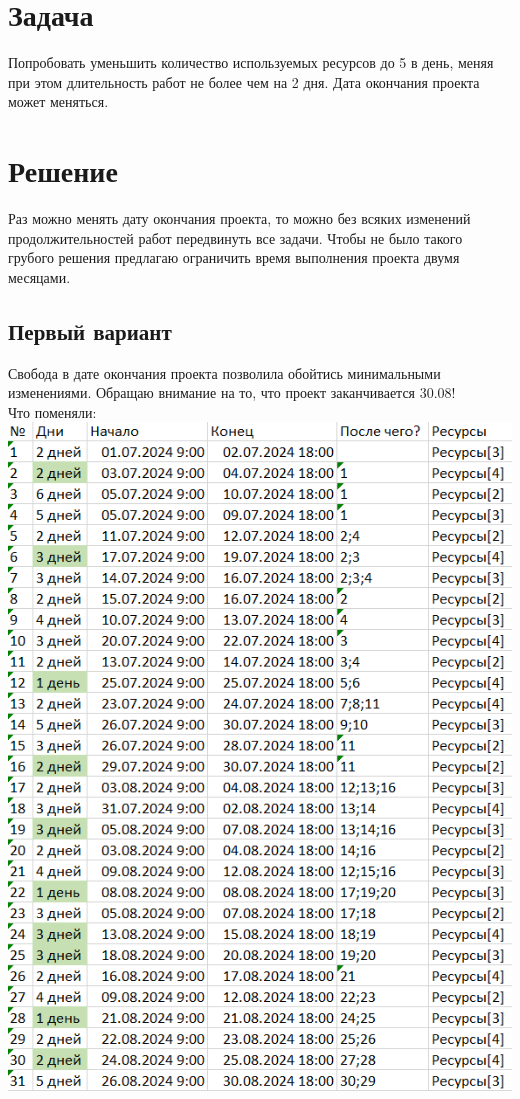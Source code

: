 \documentclass[14pt]{article}
\begin{document}
\section{Задача}
	Попробовать уменьшить количество используемых ресурсов до 5 в день,
		меняя при этом длительность работ не более чем на 2 дня.
	Дата окончания проекта может меняться.
\section{Решение}
	Раз можно менять дату окончания проекта, то можно без всяких изменений продолжительностей работ передвинуть все задачи.
	Чтобы не было такого грубого решения предлагаю ограничить время выполнения проекта двумя месяцами.
	\subsection{Первый вариант}
		Свобода в дате окончания проекта позволила обойтись минимальными изменениями.
		Обращаю внимание на то, что проект заканчивается 30.08!\\
		{\LARGE Что поменяли:}\\
		\includegraphics[height=0.6\textheight]{../img/2a1_days_change.png}\\ 
\end{document}
